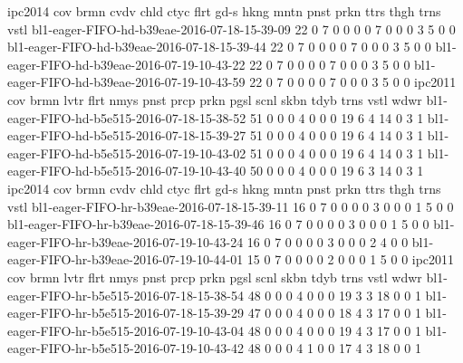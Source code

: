 ipc2014                                         cov  brmn  cvdv  chld  ctyc  flrt  gd-s  hkng  mntn  pnst  prkn  ttrs  thgh  trns  vstl  
bl1-eager-FIFO-hd-b39eae-2016-07-18-15-39-09    22   0     7     0     0     0     0     7     0     0     0     3     5     0     0  
bl1-eager-FIFO-hd-b39eae-2016-07-18-15-39-44    22   0     7     0     0     0     0     7     0     0     0     3     5     0     0  
bl1-eager-FIFO-hd-b39eae-2016-07-19-10-43-22    22   0     7     0     0     0     0     7     0     0     0     3     5     0     0  
bl1-eager-FIFO-hd-b39eae-2016-07-19-10-43-59    22   0     7     0     0     0     0     7     0     0     0     3     5     0     0  
ipc2011                                         cov  brmn  lvtr  flrt  nmys  pnst  prcp  prkn  pgsl  scnl  skbn  tdyb  trns  vstl  wdwr  
bl1-eager-FIFO-hd-b5e515-2016-07-18-15-38-52    51   0     0     0     4     0     0     0     19    6     4     14    0     3     1  
bl1-eager-FIFO-hd-b5e515-2016-07-18-15-39-27    51   0     0     0     4     0     0     0     19    6     4     14    0     3     1  
bl1-eager-FIFO-hd-b5e515-2016-07-19-10-43-02    51   0     0     0     4     0     0     0     19    6     4     14    0     3     1  
bl1-eager-FIFO-hd-b5e515-2016-07-19-10-43-40    50   0     0     0     4     0     0     0     19    6     3     14    0     3     1  
ipc2014                                         cov  brmn  cvdv  chld  ctyc  flrt  gd-s  hkng  mntn  pnst  prkn  ttrs  thgh  trns  vstl  
bl1-eager-FIFO-hr-b39eae-2016-07-18-15-39-11    16   0     7     0     0     0     0     3     0     0     0     1     5     0     0  
bl1-eager-FIFO-hr-b39eae-2016-07-18-15-39-46    16   0     7     0     0     0     0     3     0     0     0     1     5     0     0  
bl1-eager-FIFO-hr-b39eae-2016-07-19-10-43-24    16   0     7     0     0     0     0     3     0     0     0     2     4     0     0  
bl1-eager-FIFO-hr-b39eae-2016-07-19-10-44-01    15   0     7     0     0     0     0     2     0     0     0     1     5     0     0  
ipc2011                                         cov  brmn  lvtr  flrt  nmys  pnst  prcp  prkn  pgsl  scnl  skbn  tdyb  trns  vstl  wdwr  
bl1-eager-FIFO-hr-b5e515-2016-07-18-15-38-54    48   0     0     0     4     0     0     0     19    3     3     18    0     0     1  
bl1-eager-FIFO-hr-b5e515-2016-07-18-15-39-29    47   0     0     0     4     0     0     0     18    4     3     17    0     0     1  
bl1-eager-FIFO-hr-b5e515-2016-07-19-10-43-04    48   0     0     0     4     0     0     0     19    4     3     17    0     0     1  
bl1-eager-FIFO-hr-b5e515-2016-07-19-10-43-42    48   0     0     0     4     1     0     0     17    4     3     18    0     0     1  
